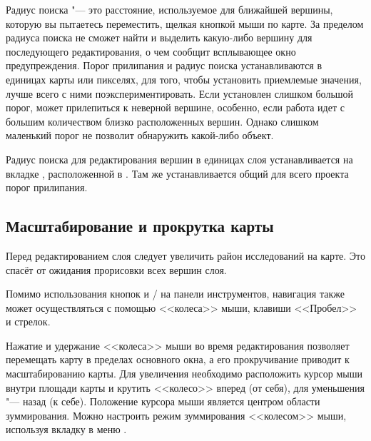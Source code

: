 
Радиус поиска "--- это расстояние, используемое \qg для 
ближайшей вершины, которую вы пытаетесь переместить, щелкая кнопкой мыши
по карте. За пределом радиуса поиска \qg не сможет найти и выделить
какую-либо вершину для последующего редактирования, о чем сообщит
всплывающее окно предупреждения. Порог прилипания и радиус поиска
устанавливаются в единицах карты или пикселях, для того, чтобы установить
приемлемые значения, лучше всего с ними поэкспериментировать. Если установлен
слишком большой порог, \qg может прилепиться к неверной вершине, особенно,
если работа идет с большим количеством близко расположенных вершин. Однако
слишком маленький порог не позволит обнаружить какой-либо объект.

Радиус поиска для редактирования вершин в единицах слоя устанавливается
на вкладке , расположенной в  \arrow
{}. Там же устанавливается общий
для всего проекта порог прилипания.

\subsection{Масштабирование и прокрутка карты}

Перед редактированием слоя следует увеличить район исследований на карте.
Это спасёт от ожидания прорисовки всех вершин слоя.

Помимо использования кнопок  и
/
на панели инструментов, навигация также может осуществляться с
помощью <<колеса>> мыши, клавиши <<Пробел>> и стрелок.


Нажатие и удержание <<колеса>> мыши во время редактирования позволяет перемещать
карту в пределах основного окна, а его прокручивание приводит к
масштабированию карты. Для увеличения необходимо расположить курсор мыши внутри
площади карты и крутить <<колесо>> вперед (от себя), для уменьшения "--- назад
(к себе). Положение курсора мыши является центром области зуммирования. Можно
настроить режим зуммирования <<колесом>> мыши, используя вкладку
 в меню  \arrow {}.


